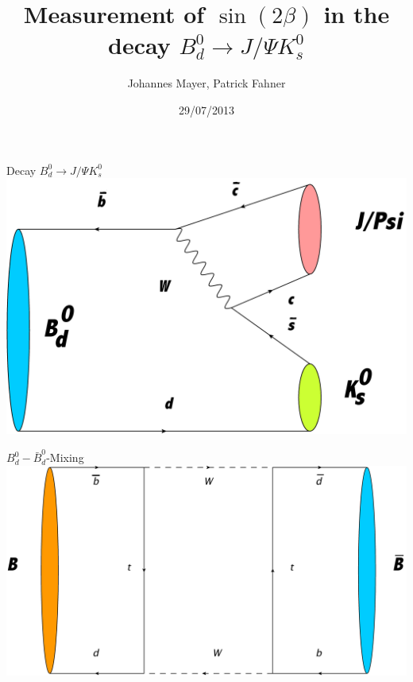 \documentclass{beamer}
\title[Measurement of $\sin(2\beta)$]{Measurement of $\sin(2\beta)$ in the decay $B_d^0 \longrightarrow J/\Psi K_s^0$}
\subtitle[]{}
\author[Johannes Mayer, Patrick Fahner]{Johannes Mayer, Patrick Fahner}
\institute[]{LHCb, Physikalisches Institut \\ Heidelberg University}
\date[29/07/13]{29/07/2013}
\begin{document}
\setlength\abovedisplayskip{0pt}
	\begin{frame}[plain]
	\titlepage
	\end{frame}
	
	\begin{frame}{Decay $B_d^0 \longrightarrow J/\Psi K_s^0$}
	\includegraphics[width=\textwidth]{Decay}
	\end{frame}
	
	\begin{frame}{$B_d^0-\bar{B}_d^0$-Mixing}
	\includegraphics[width=\textwidth]{Mixing}
	\end{frame}
	
\end{document}

